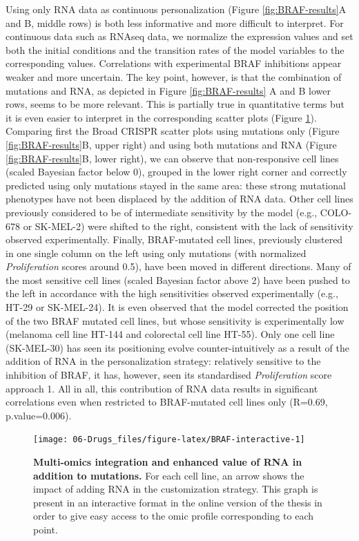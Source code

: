 \documentclass[a4paper,12pt,twoside,onecolumn,openright,final,oldfontcommands]{memoir}
\begin{document}
Using only RNA data as continuous personalization (Figure
\ref{fig:BRAF-results}A and B, middle rows) is both less informative and
more difficult to interpret. For continuous data such as RNAseq data, we
normalize the expression values and set both the initial conditions and
the transition rates of the model variables to the corresponding values.
Correlations with experimental BRAF inhibitions appear weaker and more
uncertain. The key point, however, is that the combination of mutations
and RNA, as depicted in Figure \ref{fig:BRAF-results} A and B lower
rows, seems to be more relevant. This is partially true in quantitative
terms but it is even easier to interpret in the corresponding scatter
plots (Figure \ref{fig:BRAF-interactive}). Comparing first the Broad
CRISPR scatter plots using mutations only (Figure
\ref{fig:BRAF-results}B, upper right) and using both mutations and RNA
(Figure \ref{fig:BRAF-results}B, lower right), we can observe that
non-responsive cell lines (scaled Bayesian factor below 0), grouped in
the lower right corner and correctly predicted using only mutations
stayed in the same area: these strong mutational phenotypes have not
been displaced by the addition of RNA data. Other cell lines previously
considered to be of intermediate sensitivity by the model (e.g.,
COLO-678 or SK-MEL-2) were shifted to the right, consistent with the
lack of sensitivity observed experimentally. Finally, BRAF-mutated cell
lines, previously clustered in one single column on the left using only
mutations (with normalized \emph{Proliferation} scores around 0.5), have
been moved in different directions. Many of the most sensitive cell
lines (scaled Bayesian factor above 2) have been pushed to the left in
accordance with the high sensitivities observed experimentally (e.g.,
HT-29 or SK-MEL-24). It is even observed that the model corrected the
position of the two BRAF mutated cell lines, but whose sensitivity is
experimentally low (melanoma cell line HT-144 and colorectal cell line
HT-55). Only one cell line (SK-MEL-30) has seen its positioning evolve
counter-intuitively as a result of the addition of RNA in the
personalization strategy: relatively sensitive to the inhibition of
BRAF, it has, however, seen its standardised \emph{Proliferation} score
approach 1. All in all, this contribution of RNA data results in
significant correlations even when restricted to BRAF-mutated cell lines
only (R=0.69, p.value=0.006).

\begin{figure}

{\centering \texttt{[image: 06-Drugs\_files/figure-latex/BRAF-interactive-1]} 

}

\caption[Interactive]{\textbf{Multi-omics integration and
enhanced value of RNA in addition to mutations.} For each cell line, an
arrow shows the impact of adding RNA in the customization strategy. This
graph is present in an interactive format in the online version of the
thesis in order to give easy access to the omic profile corresponding to
each point.}\label{fig:BRAF-interactive}
\end{figure}
\end{document}
